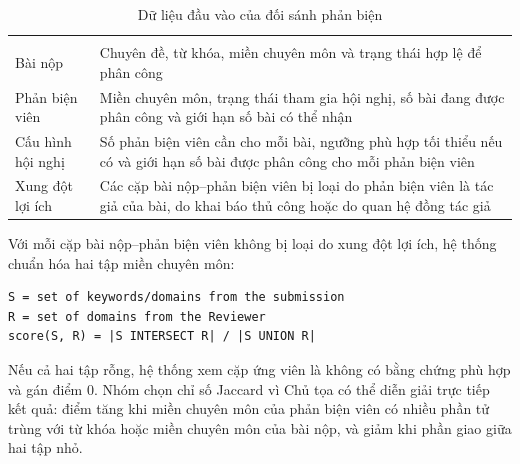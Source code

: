 \begingroup
\setlength{\tabcolsep}{2pt}
\renewcommand{\arraystretch}{1.15}
\begin{longtable}{|C{0.46\textwidth}|P{0.46\textwidth}|}
  \caption{Dữ liệu đầu vào của đối sánh phản biện}\\
  \hline
       &     \\ \hline
  \endfirsthead
  \hline
       &     \\ \hline
  \endhead
  Bài nộp   &   Chuyên đề, từ khóa, miền chuyên môn và trạng thái hợp lệ để phân công \\ \hline
  Phản biện viên      &      Miền chuyên môn, trạng thái tham gia hội nghị, số bài đang được phân công và giới hạn số bài có thể nhận \\ \hline
  Cấu hình hội nghị     &     Số phản biện viên cần cho mỗi bài, ngưỡng phù hợp tối thiểu nếu có và giới hạn số bài được phân công cho mỗi phản biện viên \\ \hline
  Xung đột lợi ích      &      Các cặp bài nộp--phản biện viên bị loại do phản biện viên là tác giả của bài, do khai báo thủ công hoặc do quan hệ đồng tác giả \\ \hline
\end{longtable}
\endgroup

Với mỗi cặp bài nộp--phản biện viên không bị loại do xung đột lợi ích, hệ thống chuẩn hóa hai tập miền chuyên môn:

\begin{lstlisting}
S = set of keywords/domains from the submission
R = set of domains from the Reviewer
score(S, R) = |S INTERSECT R| / |S UNION R|
\end{lstlisting}

Nếu cả hai tập rỗng, hệ thống xem cặp ứng viên là không có bằng chứng phù hợp và gán điểm 0. Nhóm chọn chỉ số Jaccard vì Chủ tọa có thể diễn giải trực tiếp kết quả: điểm tăng khi miền chuyên môn của phản biện viên có nhiều phần tử trùng với từ khóa hoặc miền chuyên môn của bài nộp, và giảm khi phần giao giữa hai tập nhỏ.

